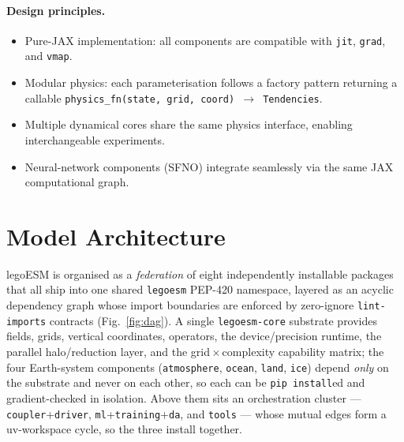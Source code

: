 \documentclass[11pt,a4paper]{article}
\begin{document}
\paragraph{Design principles.}
\begin{itemize}[nosep]
  \item Pure-JAX implementation: all components are compatible with \texttt{jit}, \texttt{grad}, and \texttt{vmap}.
  \item Modular physics: each parameterisation follows a factory pattern returning a callable \texttt{physics\_fn(state, grid, coord) $\to$ Tendencies}.
  \item Multiple dynamical cores share the same physics interface, enabling interchangeable experiments.
  \item Neural-network components (SFNO) integrate seamlessly via the same JAX computational graph.
\end{itemize}

\section{Model Architecture}

legoESM is organised as a \emph{federation} of eight independently installable
packages that all ship into one shared \texttt{legoesm} PEP-420 namespace, layered
as an acyclic dependency graph whose import boundaries are enforced by
zero-ignore \texttt{lint-imports} contracts (Fig.~\ref{fig:dag}).  A single
\texttt{legoesm-core} substrate provides fields, grids, vertical coordinates,
operators, the device/precision runtime, the parallel halo/reduction layer, and
the grid\,$\times$\,complexity capability matrix; the four Earth-system components
(\texttt{atmosphere}, \texttt{ocean}, \texttt{land}, \texttt{ice}) depend
\emph{only} on the substrate and never on each other, so each can be
\texttt{pip install}ed and gradient-checked in isolation.  Above them sits an
orchestration cluster --- \texttt{coupler}+\texttt{driver},
\texttt{ml}+\texttt{training}+\texttt{da}, and \texttt{tools} --- whose mutual
edges form a uv-workspace cycle, so the three install together.
\end{document}
